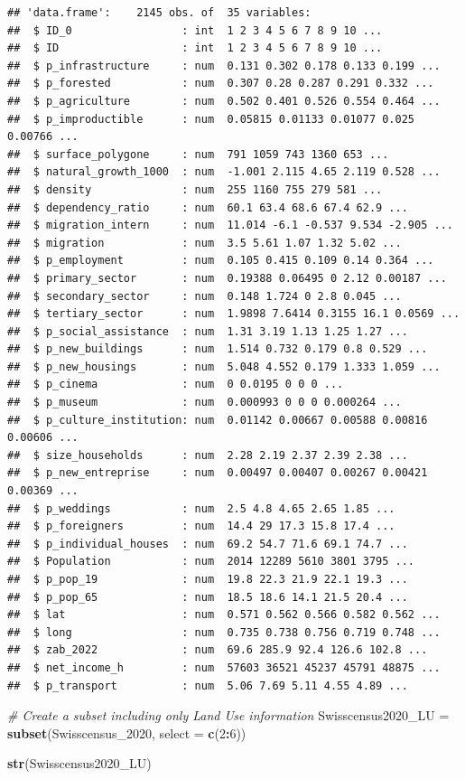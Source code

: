 \documentclass[
]{article}
\newenvironment{Shaded}{\begin{snugshade}}{\end{snugshade}}
\newcommand{\AttributeTok}[1]{\textcolor[rgb]{0.13,0.29,0.53}{#1}}
\newcommand{\CommentTok}[1]{\textcolor[rgb]{0.56,0.35,0.01}{\textit{#1}}}
\newcommand{\DecValTok}[1]{\textcolor[rgb]{0.00,0.00,0.81}{#1}}
\newcommand{\FunctionTok}[1]{\textcolor[rgb]{0.13,0.29,0.53}{\textbf{#1}}}
\newcommand{\NormalTok}[1]{#1}
\newcommand{\OtherTok}[1]{\textcolor[rgb]{0.56,0.35,0.01}{#1}}
\newcommand{\SpecialCharTok}[1]{\textcolor[rgb]{0.81,0.36,0.00}{\textbf{#1}}}
\begin{document}
\begin{verbatim}
## 'data.frame':    2145 obs. of  35 variables:
##  $ ID_0                 : int  1 2 3 4 5 6 7 8 9 10 ...
##  $ ID                   : int  1 2 3 4 5 6 7 8 9 10 ...
##  $ p_infrastructure     : num  0.131 0.302 0.178 0.133 0.199 ...
##  $ p_forested           : num  0.307 0.28 0.287 0.291 0.332 ...
##  $ p_agriculture        : num  0.502 0.401 0.526 0.554 0.464 ...
##  $ p_improductible      : num  0.05815 0.01133 0.01077 0.025 0.00766 ...
##  $ surface_polygone     : num  791 1059 743 1360 653 ...
##  $ natural_growth_1000  : num  -1.001 2.115 4.65 2.119 0.528 ...
##  $ density              : num  255 1160 755 279 581 ...
##  $ dependency_ratio     : num  60.1 63.4 68.6 67.4 62.9 ...
##  $ migration_intern     : num  11.014 -6.1 -0.537 9.534 -2.905 ...
##  $ migration            : num  3.5 5.61 1.07 1.32 5.02 ...
##  $ p_employment         : num  0.105 0.415 0.109 0.14 0.364 ...
##  $ primary_sector       : num  0.19388 0.06495 0 2.12 0.00187 ...
##  $ secondary_sector     : num  0.148 1.724 0 2.8 0.045 ...
##  $ tertiary_sector      : num  1.9898 7.6414 0.3155 16.1 0.0569 ...
##  $ p_social_assistance  : num  1.31 3.19 1.13 1.25 1.27 ...
##  $ p_new_buildings      : num  1.514 0.732 0.179 0.8 0.529 ...
##  $ p_new_housings       : num  5.048 4.552 0.179 1.333 1.059 ...
##  $ p_cinema             : num  0 0.0195 0 0 0 ...
##  $ p_museum             : num  0.000993 0 0 0 0.000264 ...
##  $ p_culture_institution: num  0.01142 0.00667 0.00588 0.00816 0.00606 ...
##  $ size_households      : num  2.28 2.19 2.37 2.39 2.38 ...
##  $ p_new_entreprise     : num  0.00497 0.00407 0.00267 0.00421 0.00369 ...
##  $ p_weddings           : num  2.5 4.8 4.65 2.65 1.85 ...
##  $ p_foreigners         : num  14.4 29 17.3 15.8 17.4 ...
##  $ p_individual_houses  : num  69.2 54.7 71.6 69.1 74.7 ...
##  $ Population           : num  2014 12289 5610 3801 3795 ...
##  $ p_pop_19             : num  19.8 22.3 21.9 22.1 19.3 ...
##  $ p_pop_65             : num  18.5 18.6 14.1 21.5 20.4 ...
##  $ lat                  : num  0.571 0.562 0.566 0.582 0.562 ...
##  $ long                 : num  0.735 0.738 0.756 0.719 0.748 ...
##  $ zab_2022             : num  69.6 285.9 92.4 126.6 102.8 ...
##  $ net_income_h         : num  57603 36521 45237 45791 48875 ...
##  $ p_transport          : num  5.06 7.69 5.11 4.55 4.89 ...
\end{verbatim}

\begin{Shaded}
\begin{Highlighting}[]
\CommentTok{\# Create a subset including only Land Use information}
\NormalTok{Swisscensus2020\_LU }\OtherTok{=} \FunctionTok{subset}\NormalTok{(Swisscensus\_2020, }\AttributeTok{select =} \FunctionTok{c}\NormalTok{(}\DecValTok{2}\SpecialCharTok{:}\DecValTok{6}\NormalTok{))}

\FunctionTok{str}\NormalTok{(Swisscensus2020\_LU)}
\end{Highlighting}
\end{Shaded}
\end{document}
